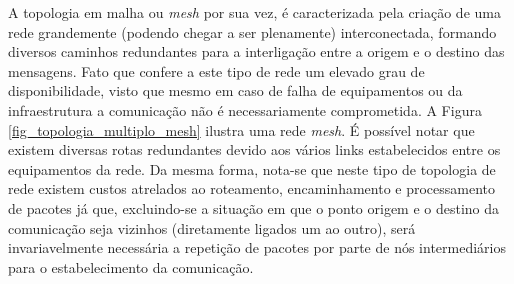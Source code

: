A topologia em malha ou \emph{mesh} por sua vez, é caracterizada pela criação de uma rede grandemente (podendo chegar a ser plenamente) interconectada, formando diversos caminhos redundantes para a interligação entre a origem e o destino das mensagens. Fato que confere a este tipo de rede um elevado grau de disponibilidade, visto que mesmo em caso de falha de equipamentos ou da infraestrutura a comunicação não é necessariamente comprometida. A Figura \ref{fig_topologia_multiplo_mesh} ilustra uma rede \emph{mesh}. É possível notar que existem diversas rotas redundantes devido aos vários links estabelecidos entre os equipamentos da rede. Da mesma forma, nota-se que neste tipo de topologia de rede existem custos atrelados ao roteamento, encaminhamento e processamento de pacotes já que, excluindo-se a situação em que o ponto origem e o destino da comunicação seja vizinhos (diretamente ligados um ao outro), será invariavelmente necessária a repetição de pacotes por parte de nós intermediários para o estabelecimento da comunicação.



